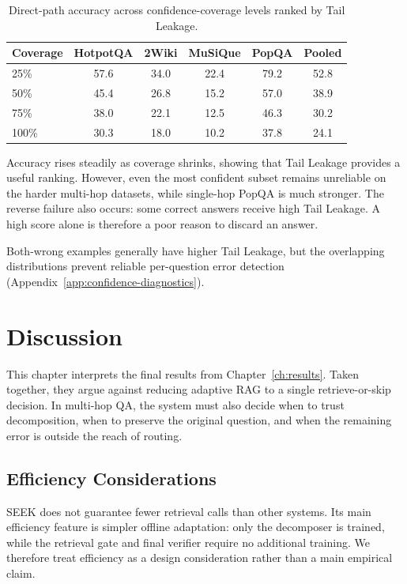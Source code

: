 \documentclass{nthu_thesis}
\begin{document}
\begin{thesiscjk}
\begin{table}[h]
    \centering
    \caption[Direct-Path Accuracy by Confidence Coverage]{Direct-path accuracy across confidence-coverage levels ranked by Tail Leakage.}
    \label{tab:tail-leakage-selective}
    \setlength{\tabcolsep}{8pt}
    \small
    \begin{tabular}{ l c c c c c }
        \toprule
        Coverage & HotpotQA & 2Wiki & MuSiQue & PopQA & Pooled \\
        \midrule
        25\% & 57.6 & 34.0 & 22.4 & 79.2 & 52.8 \\
        50\% & 45.4 & 26.8 & 15.2 & 57.0 & 38.9 \\
        75\% & 38.0 & 22.1 & 12.5 & 46.3 & 30.2 \\
        100\% & 30.3 & 18.0 & 10.2 & 37.8 & 24.1 \\
        \bottomrule
    \end{tabular}
\end{table}

Accuracy rises steadily as coverage shrinks, showing that Tail Leakage provides a useful ranking. However, even the most confident subset remains unreliable on the harder multi-hop datasets, while single-hop PopQA is much stronger. The reverse failure also occurs: some correct answers receive high Tail Leakage. A high score alone is therefore a poor reason to discard an answer.

Both-wrong examples generally have higher Tail Leakage, but the overlapping distributions prevent reliable per-question error detection (Appendix~\ref{app:confidence-diagnostics}).


\chapter{Discussion}
\label{ch:discussion}

This chapter interprets the final results from Chapter~\ref{ch:results}. Taken together, they argue against reducing adaptive RAG to a single retrieve-or-skip decision. In multi-hop QA, the system must also decide when to trust decomposition, when to preserve the original question, and when the remaining error is outside the reach of routing.

\section{Efficiency Considerations}
\label{sec:cost-benefit}

SEEK does not guarantee fewer retrieval calls than other systems. Its main efficiency feature is simpler offline adaptation: only the decomposer is trained, while the retrieval gate and final verifier require no additional training. We therefore treat efficiency as a design consideration rather than a main empirical claim.


\end{thesiscjk}
\end{document}
